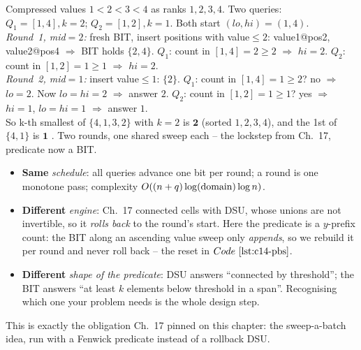 \begin{tracebox}[PBS on \(a=(4,1,3,2)\): k-th in a range]
Compressed values \(1<2<3<4\) as ranks \(1,2,3,4\).  Two queries:
\(Q_1=[1,4],k{=}2\); \(Q_2=[1,2],k{=}1\).  Both start \((lo,hi)=(1,4)\).\\
\emph{Round~1, mid\(=2\):} fresh BIT, insert positions with value\(\le2\):
value1@pos2, value2@pos4 \(\Rightarrow\) BIT holds \(\{2,4\}\).
\(Q_1\): count in \([1,4]=2\ge2\) \(\Rightarrow\) \(hi=2\).
\(Q_2\): count in \([1,2]=1\ge1\) \(\Rightarrow\) \(hi=2\).\\
\emph{Round~2, mid\(=1\):} insert value\(\le1\): \(\{2\}\).
\(Q_1\): count in \([1,4]=1\ge2\)? no \(\Rightarrow\) \(lo=2\).  Now \(lo{=}hi{=}2\)
\(\Rightarrow\) answer \(2\).
\(Q_2\): count in \([1,2]=1\ge1\)? yes \(\Rightarrow\) \(hi=1\), \(lo{=}hi{=}1\)
\(\Rightarrow\) answer \(1\).\\
So k-th smallest of \(\{4,1,3,2\}\) with \(k{=}2\) is \(\mathbf{2}\) (sorted
\(1,2,3,4\)), and the 1st of \(\{4,1\}\) is \(\mathbf{1}\) \checkmark.  Two
rounds, one shared sweep each -- the lockstep from Ch.~17, predicate now a BIT.
\end{tracebox}

\begin{comparisonbox}
\begin{itemize}[nosep,leftmargin=1.4em]
  \item \textbf{Same} \emph{schedule}: all queries advance one bit per round;
        a round is one monotone pass; complexity \(O((n+q)\log(\text{domain})
        \log n)\).
  \item \textbf{Different} \emph{engine}: Ch.~17 connected cells with DSU, whose
        unions are not invertible, so it \emph{rolls back} to the round's start.
        Here the predicate is a \(y\)-prefix count: the BIT along an ascending
        value sweep only \emph{appends}, so we rebuild it per round and never
        roll back -- the  reset in \(\coderef{c14-pbs}\).
  \item \textbf{Different} \emph{shape of the predicate}: DSU answers
        ``connected by threshold''; the BIT answers ``at least \(k\) elements
        below threshold in a span''.  Recognising which one your problem needs
        is the whole design step.
\end{itemize}
This is exactly the obligation Ch.~17 pinned on this chapter: the sweep-a-batch
idea, run with a Fenwick predicate instead of a rollback DSU.
\end{comparisonbox}

